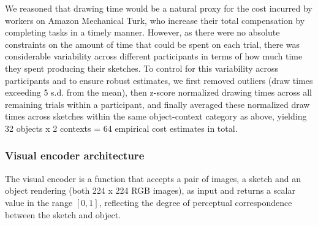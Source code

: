 \documentclass[9pt,twocolumn,twoside]{pnas-new}
\newcommand{\mwu}[1]{{\color{green}{[mwu: #1]}}}
\begin{document}
{%
We reasoned that drawing time would be a natural proxy for the cost incurred by workers on Amazon Mechanical Turk, who increase their total compensation by completing tasks in a timely manner. 
However, as there were no absolute constraints on the amount of time that could be spent on each trial, there was considerable variability across different participants in terms of how much time they spent producing their sketches. 
To control for this variability across participants and to ensure robust estimates, we first removed outliers (draw times exceeding 5 s.d. from the mean), then z-score normalized drawing times across all remaining trials within a participant, and finally averaged these normalized draw times across sketches within the same object-context category as above, yielding 32 objects x 2 contexts = 64 empirical cost estimates in total.

\subsubsection*{Visual encoder architecture}


The visual encoder is a function that accepts a pair of images, a sketch and an object rendering (both 224 x 224 RGB images), as input and returns a scalar value in the range $[0,1]$, reflecting the degree of perceptual correspondence between the sketch and object. 

}
\end{document}
